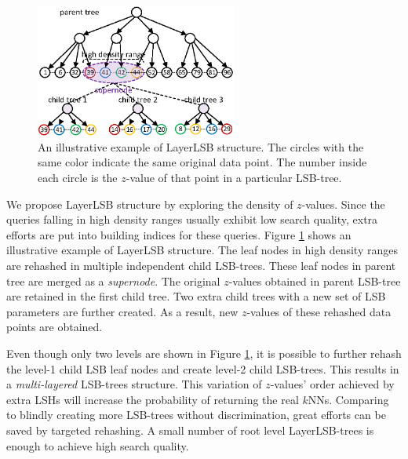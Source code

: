 \begin{figure}[t]
\vspace{-0.1in}
    \centerline{\includegraphics[width=2.6in]{fig/layerlsb.eps}}
    \caption{An illustrative example of LayerLSB structure. The circles with the same color indicate the same original data point. The number inside each circle is the $z$-value of that point in a particular LSB-tree.}
    \label{fig:layerlsb}
\end{figure}

We propose LayerLSB structure by exploring the density of $z$-values. Since the queries falling in high density ranges usually exhibit low search quality, extra efforts are put into building indices for these queries. Figure \ref{fig:layerlsb} shows an illustrative example of LayerLSB structure. The leaf nodes in high density ranges are rehashed in multiple independent child LSB-trees. These leaf nodes in parent tree are merged as a \emph{supernode}. The original $z$-values obtained in parent LSB-tree are retained in the first child tree. Two extra child trees with a new set of LSB parameters are further created. As a result, new $z$-values of these rehashed data points are obtained.

Even though only two levels are shown in Figure \ref{fig:layerlsb}, it is possible to further rehash the level-1 child LSB leaf nodes and create level-2 child LSB-trees. This results in a \emph{multi-layered} LSB-trees structure. This variation of $z$-values' order achieved by extra LSHs will increase the probability of returning the real $k$NNs. Comparing to blindly creating more LSB-trees without discrimination, great efforts can be saved by targeted rehashing. A small number of root level LayerLSB-trees is enough to achieve high search quality.
